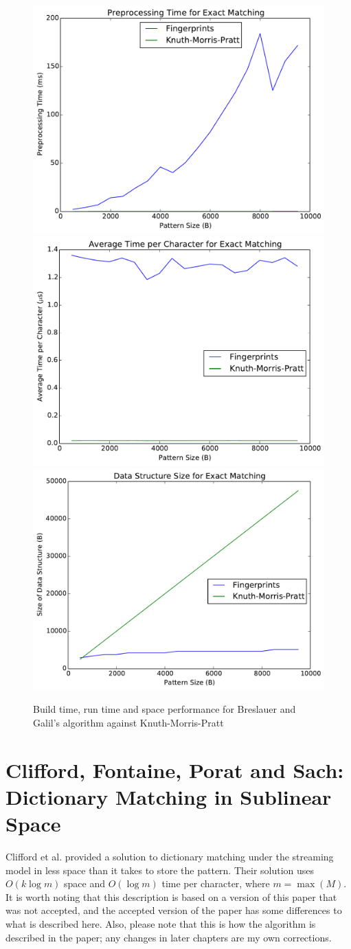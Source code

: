 \documentclass[ %
                    author={Dominic Joseph Moylett},
                    degree={MEng},
                     title={Dictionary Matching with Fingerprints},
                  subtitle={An Empirical Analysis},
                      type={research},
                      year={2015} ]{dissertation}
\begin{document}
\begin{figure}[t]
\begin{center}
  \includegraphics[width=0.5\linewidth]{summer_build_time}\\
  \includegraphics[width=0.5\linewidth]{summer_run_time}\includegraphics[width=0.5\linewidth]{summer_size}
\end{center}
\caption{Build time, run time and space performance for Breslauer and Galil's algorithm against Knuth-Morris-Pratt}
\label{fig:summer-results}
\end{figure}

\section{Clifford, Fontaine, Porat and Sach: Dictionary Matching in Sublinear Space}
\label{sec:theory-clifford}

Clifford et al. \cite{2015arXiv150406242C} provided a solution to dictionary matching under the streaming model in less space than it takes to store the pattern. Their solution uses $O(k\log m)$ space and $O(\log m)$ time per character, where $m = \max(M)$. It is worth noting that this description is based on a version of this paper that was not accepted, and the accepted version of the paper has some differences to what is described here. Also, please note that this is how the algorithm is described in the paper; any changes in later chapters are my own corrections.
\end{document}
